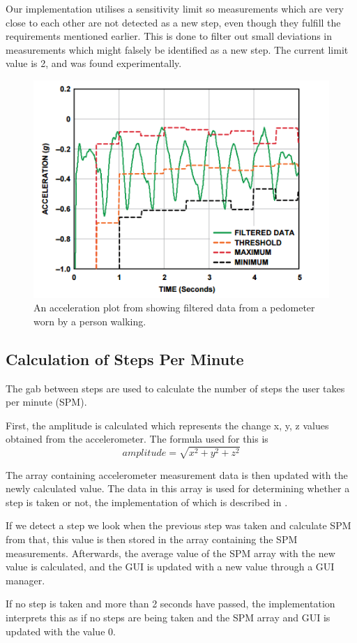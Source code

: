 Our implementation utilises a sensitivity limit so measurements which are very close to each other are not detected as a new step, even though they fulfill the requirements mentioned earlier. This is done to filter out small deviations in measurements which might falsely be identified as a new step. The current limit value is 2, and was found experimentally.
\begin{figure}[h!]
  \centering
    \includegraphics[scale=0.8]{Images/accPlot.png}
  \caption{An acceleration plot from \citet[p. 2]{zhao:pedometer} showing filtered data from a pedometer worn by a person walking.}
  \label{fig:zhaoGraph}
\end{figure}


\subsection{Calculation of Steps Per Minute}
The gab between steps are used to calculate the number of steps the user takes per minute (SPM).

First, the amplitude is calculated which represents the change x, y, z values obtained from the accelerometer. The formula used for this is $$amplitude = \sqrt{x^{2} + y^{2} + z^{2}}$$

The array containing accelerometer measurement data is then updated with the newly calculated value. The data in this array is used for determining whether a step is taken or not, the implementation of which is described in .

If we detect a step we look when the previous step was taken and calculate SPM from that, this value is then stored in the array containing the SPM measurements. Afterwards, the average value of the SPM array with the new value is calculated, and the GUI is updated with a new value through a GUI manager.

If no step is taken and more than 2 seconds have passed, the implementation interprets this as if no steps are being taken and the SPM array and GUI is updated with the value 0.